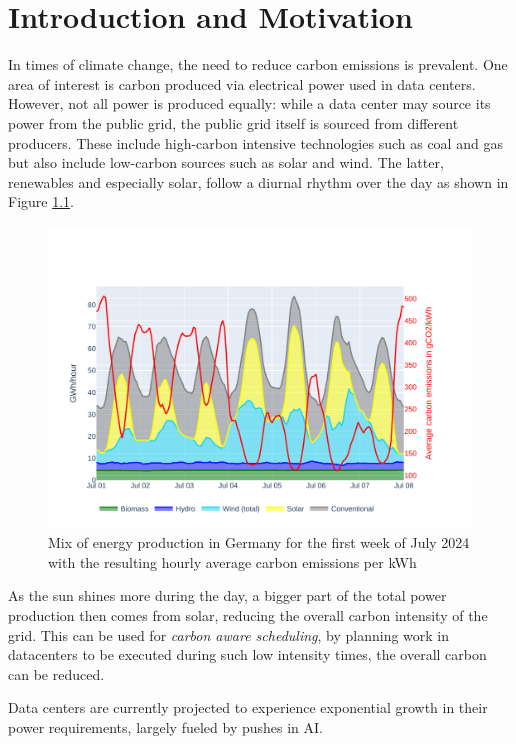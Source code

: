 \chapter{Introduction and Motivation}

In times of climate change, the need to reduce carbon emissions is prevalent. 
One area of interest is carbon produced via electrical power used in data centers. 
However, not all power is produced equally: while a data center may source its power from the public grid, the public grid itself is sourced from different producers. 
These include high-carbon intensive technologies such as coal and gas but also include low-carbon sources such as solar and wind. 
The latter, renewables and especially solar, follow a diurnal rhythm over the day as shown in Figure \ref{fig:energy_mix}.

\begin{figure}
    \includegraphics[width=\linewidth]{agorameter/energy_production_week.pdf}
    \caption[short]{Mix of energy production in Germany for the first week of July 2024 with the resulting hourly average carbon emissions per kWh}
    \label{fig:energy_mix}
\end{figure}

As the sun shines more during the day, a bigger part of the total power production then comes from solar, reducing the overall carbon intensity of the grid.
This can be used for \emph{carbon aware scheduling}, by planning work in datacenters to be executed during such low intensity times, the overall carbon can be reduced.

Data centers are currently projected to experience exponential growth in their power requirements, largely fueled by pushes in AI.\cite{schwartz_green_2019}

